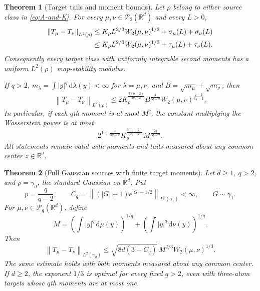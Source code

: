 \documentclass[11pt]{article}
\numberwithin{equation}{section}
\newtheorem{theorem}{Theorem}[section]
\theoremstyle{remark}
\newcommand{\R}{\mathbb R}
\newcommand{\Prob}{\mathcal P}
\newcommand{\dd}{\,\mathrm d}
\newcommand{\norm}[1]{\left\lVert #1\right\rVert}
\begin{document}
\begin{theorem}[Target tails and moment bounds]\label{thm:tails}
Let $\rho$ belong to either source class in \eqref{eq:A-and-K}. For every $\mu,\nu\in\Prob_2(\R^d)$ and every $L>0$,
\begin{align}
 \norm{T_\mu-T_\nu}_{L^2(\rho)}
 &\le K_\rho L^{2/3}W_2(\mu,\nu)^{1/3}
       +\sigma_\mu(L)+\sigma_\nu(L)\notag\\
 &\le K_\rho L^{2/3}W_2(\mu,\nu)^{1/3}
       +\tau_\mu(L)+\tau_\nu(L).\label{eq:tail-bound}
\end{align}
Consequently every target class with uniformly integrable second moments has a uniform $L^2(\rho)$ map-stability modulus.

If $q>2$, $m_\lambda=\int|y|^q\dd\lambda(y)<\infty$ for $\lambda=\mu,\nu$, and $B=\sqrt{m_\mu}+\sqrt{m_\nu}$, then
\begin{equation}\label{eq:q-moment-bound}
 \norm{T_\mu-T_\nu}_{L^2(\rho)}
 \le 2K_\rho^{\frac{3(q-2)}{3q-2}}B^{\frac4{3q-2}}
       W_2(\mu,\nu)^{\frac{q-2}{3q-2}}.
\end{equation}
In particular, if each $q$th moment is at most $M^q$, the constant multiplying the Wasserstein power is at most
\[
 2^{1+\frac4{3q-2}}
 K_\rho^{\frac{3(q-2)}{3q-2}}M^{\frac{2q}{3q-2}}.
\]
All statements remain valid with moments and tails measured about any common center $z\in\R^d$.
\end{theorem}

\begin{theorem}[Full Gaussian sources with finite target moments]\label{thm:gaussian-moments}
Let $d\ge1$, $q>2$, and $\rho=\gamma_d$, the standard Gaussian on $\R^d$. Put
\begin{equation}\label{eq:gaussian-Cq}
 p=\frac q{q-2},\qquad
 C_q=\left\|(|G|+1)e^{|G|+1/2}\right\|_{L^p(\gamma_1)}<\infty,
 \qquad G\sim\gamma_1.
\end{equation}
For $\mu,\nu\in\Prob_q(\R^d)$, define
\[
 M=\left(\int|y|^q\dd\mu(y)\right)^{1/q}
   +\left(\int|y|^q\dd\nu(y)\right)^{1/q}.
\]
Then
\begin{equation}\label{eq:gaussian-moment-bound}
 \norm{T_\mu-T_\nu}_{L^2(\gamma_d)}
 \le\sqrt{8d(3+C_q)}\,M^{2/3}W_2(\mu,\nu)^{1/3}.
\end{equation}
The same estimate holds with both moments measured about any common center. If $d\ge2$, the exponent $1/3$ is optimal for every fixed $q>2$, even with three-atom targets whose $q$th moments are at most one.
\end{theorem}
\end{document}
